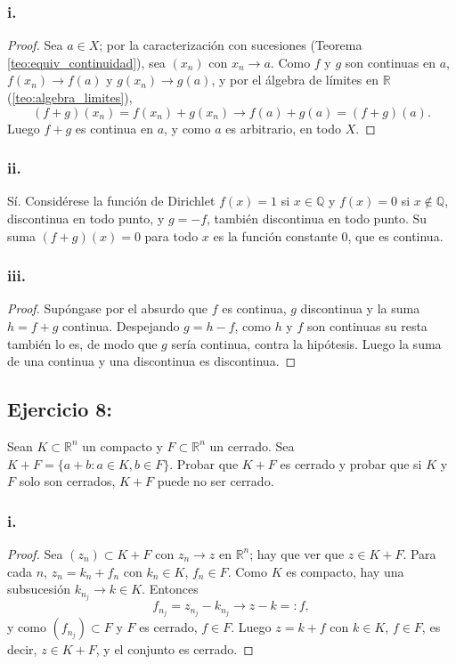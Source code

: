 \documentclass[11pt, a4paper]{article}
\begin{document}
\subsubsection*{i.}
\begin{proof}
Sea $a \in X$; por la caracterización con sucesiones (Teorema \ref{teo:equiv_continuidad}), sea
$(x_n)$ con $x_n \to a$. Como $f$ y $g$ son
continuas en $a$, $f(x_n) \to f(a)$ y $g(x_n) \to g(a)$, y por el álgebra de límites en $\mathbb{R}$
(\ref{teo:algebra_limites}),
$$ (f+g)(x_n) = f(x_n) + g(x_n) \to f(a) + g(a) = (f+g)(a). $$
Luego $f+g$ es continua en $a$, y como $a$ es arbitrario, en todo $X$.
\end{proof}

\subsubsection*{ii.}
Sí. Considérese la función de Dirichlet $f(x) = 1$ si $x \in \mathbb{Q}$ y $f(x) = 0$ si
$x \notin \mathbb{Q}$, discontinua en todo punto, y $g = -f$, también discontinua en todo punto. Su
suma $(f+g)(x) = 0$ para todo $x$ es la función constante $0$, que es continua.

\subsubsection*{iii.}
\begin{proof}
Supóngase por el absurdo que $f$ es continua, $g$ discontinua y la suma $h = f + g$ continua.
Despejando $g = h - f$, como $h$ y $f$ son continuas su resta también lo es, de modo que $g$ sería
continua, contra la hipótesis. Luego la suma de una continua y una discontinua es discontinua.
\end{proof}

\subsection*{Ejercicio 8:}

Sean $K \subset \mathbb{R}^n$ un compacto y $F \subset \mathbb{R}^n$ un cerrado. Sea
$K+F = \{a+b : a \in K, b \in F\}$.
Probar que $K+F$ es cerrado y probar que si $K$ y $F$ solo son cerrados, $K+F$ puede no ser cerrado.

\subsubsection*{i.}
\begin{proof}
Sea $(z_n) \subset K+F$ con $z_n \to z$ en $\mathbb{R}^n$; hay que ver que $z \in K+F$. Para cada $n$,
$z_n = k_n + f_n$ con $k_n \in K$, $f_n \in F$. Como $K$ es compacto, hay una subsucesión
$k_{n_j} \to k \in K$. Entonces
$$ f_{n_j} = z_{n_j} - k_{n_j} \to z - k =: f, $$
y como $(f_{n_j}) \subset F$ y $F$ es cerrado, $f \in F$. Luego $z = k + f$ con $k \in K$, $f \in F$,
es decir, $z \in K+F$, y el conjunto es cerrado.
\end{proof}
\end{document}
